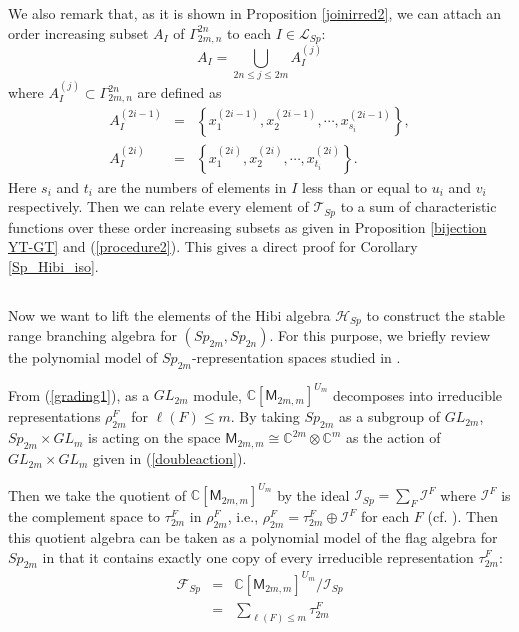 \documentclass[11pt]{amsart}
\numberwithin{equation}{subsection}
\begin{document}
We also remark that, as it is shown in Proposition \ref{joinirred2}, we can attach
an order increasing subset $A_{I}$ of $\Gamma _{2m,n}^{2n}$ to each $I\in 
\mathcal{L}_{Sp}$:
\begin{equation}
A_{I} = \bigcup_{2n \leq j \leq 2m} A_I ^{(j)}
\end{equation}
where $ A_I ^{(j)} \subset \Gamma_{2m,n}^{2n}$ are defined as
\begin{eqnarray*} 
A_{I}^{(2i-1)} &=& \left\{ x_{1}^{(2i-1)}, x_{2}^{(2i-1)}, \cdots, x_{s_{i}}^{(2i-1)} \right\}, \\
A_{I}^{(2i)} &=& \left\{ x_{1}^{(2i)}, x_{2}^{(2i)}, \cdots, x_{t_{i}}^{(2i)} \right\}.
\end{eqnarray*}
Here $s_i$ and $t_i$ are the numbers of elements
in $I$ less than or equal to $u_i$ and $v_i$ respectively.
Then we can relate every element of $\mathcal{T}_{Sp}$ to a sum of 
characteristic functions over these order increasing subsets as given in
Proposition \ref{bijection YT-GT} and (\ref{procedure2}).
This gives a direct proof for Corollary \ref{Sp_Hibi_iso}.


\subsection{}

Now we want to lift the elements of the Hibi algebra $\mathcal{H}_{Sp}$
to construct the stable range branching algebra for $({Sp}_{2m}, {Sp}_{2n})$. 
For this purpose, we briefly review the polynomial model of ${Sp}_{2m}$-representation 
spaces studied in \cite{Ki08}.

\smallskip

From (\ref{grading1}), as a ${GL}_{2m}$ module, $\mathbb{C}[\mathsf{M}_{2m,m}]^{U_{m}}$ 
decomposes into irreducible representations $\rho_{2m}^{F} $ for $\ell (F)\leq m$. 
By taking ${Sp}_{2m}$ as a subgroup of ${GL}_{2m}$, ${Sp}_{2m}\times {GL}_{m}$ is 
acting on the space $\mathsf{M}_{2m,m} \cong \mathbb{C}^{2m} \otimes \mathbb{C}^m$ as 
the action of ${GL}_{2m}\times {GL}_{m}$ given in (\ref{doubleaction}).
 
Then we take the quotient of $\mathbb{C}[\mathsf{M}_{2m,m}]^{U_{m}}$ by
the ideal $\mathcal{I}_{{Sp}}=\sum_{F}\mathcal{I}^{F}$ where 
$\mathcal{I}^{F}$ is the complement space to $\tau _{2m}^{F}$ in 
$\rho _{2m}^{F}$, i.e., $\rho _{2m}^{F}=\tau _{2m}^{F}\oplus \mathcal{I}^{F}$ 
for each $F$ (cf. \cite[\S 17.3]{FH91}). Then this quotient algebra can be taken 
as a polynomial model of 
the flag algebra for ${Sp}_{2m}$ in that it contains exactly one copy of every 
irreducible representation $\tau _{2m}^{F}$:
\begin{eqnarray*}
\mathcal{F}_{{Sp}} &=&\mathbb{C}[\mathsf{M}_{2m,m}]^{U_{m}}/\mathcal{I}_{{Sp}} \\
&=&\sum_{\ell (F)\leq m}\tau _{2m}^{F}
\end{eqnarray*}
\end{document}
